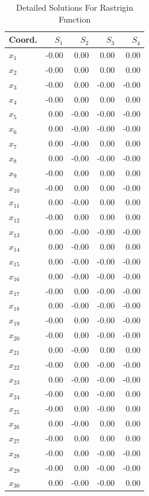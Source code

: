 \documentclass[conference]{IEEEtran}
\begin{document}
\begin{table}[H]
\centering
\caption{Detailed Solutions For Rastrigin Function}
\label{detailedsolutions:rastrigin30d}
\begin{tabular}{lrrrr}
\toprule
  Coord. &  $S_{1}$ &  $S_{2}$ &  $S_{3}$ &  $S_{4}$ \\
\midrule
 $x_{1}$ &    -0.00 &     0.00 &     0.00 &     0.00 \\
 $x_{2}$ &    -0.00 &     0.00 &     0.00 &     0.00 \\
 $x_{3}$ &    -0.00 &     0.00 &    -0.00 &    -0.00 \\
 $x_{4}$ &    -0.00 &     0.00 &     0.00 &     0.00 \\
 $x_{5}$ &     0.00 &    -0.00 &    -0.00 &    -0.00 \\
 $x_{6}$ &     0.00 &    -0.00 &    -0.00 &    -0.00 \\
 $x_{7}$ &     0.00 &    -0.00 &     0.00 &     0.00 \\
 $x_{8}$ &     0.00 &    -0.00 &    -0.00 &    -0.00 \\
 $x_{9}$ &    -0.00 &     0.00 &     0.00 &     0.00 \\
$x_{10}$ &    -0.00 &     0.00 &     0.00 &    -0.00 \\
$x_{11}$ &     0.00 &    -0.00 &     0.00 &     0.00 \\
$x_{12}$ &    -0.00 &     0.00 &     0.00 &     0.00 \\
$x_{13}$ &     0.00 &    -0.00 &    -0.00 &    -0.00 \\
$x_{14}$ &     0.00 &    -0.00 &     0.00 &     0.00 \\
$x_{15}$ &     0.00 &    -0.00 &    -0.00 &    -0.00 \\
$x_{16}$ &     0.00 &    -0.00 &    -0.00 &    -0.00 \\
$x_{17}$ &    -0.00 &     0.00 &    -0.00 &    -0.00 \\
$x_{18}$ &     0.00 &    -0.00 &    -0.00 &    -0.00 \\
$x_{19}$ &    -0.00 &     0.00 &    -0.00 &    -0.00 \\
$x_{20}$ &    -0.00 &     0.00 &    -0.00 &    -0.00 \\
$x_{21}$ &     0.00 &    -0.00 &     0.00 &     0.00 \\
$x_{22}$ &    -0.00 &     0.00 &    -0.00 &    -0.00 \\
$x_{23}$ &     0.00 &    -0.00 &    -0.00 &    -0.00 \\
$x_{24}$ &    -0.00 &     0.00 &    -0.00 &     0.00 \\
$x_{25}$ &    -0.00 &     0.00 &    -0.00 &     0.00 \\
$x_{26}$ &     0.00 &    -0.00 &     0.00 &     0.00 \\
$x_{27}$ &    -0.00 &     0.00 &     0.00 &     0.00 \\
$x_{28}$ &    -0.00 &     0.00 &    -0.00 &    -0.00 \\
$x_{29}$ &    -0.00 &     0.00 &    -0.00 &    -0.00 \\
$x_{30}$ &     0.00 &    -0.00 &    -0.00 &     0.00 \\
\bottomrule
\end{tabular}
\end{table}
\end{document}
